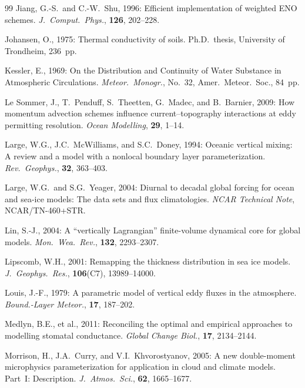 \documentclass[11pt,twoside]{report}
\begin{document}
\begin{thebibliography}{99}
Jiang, G.-S.\ and C.-W.~Shu, 1996:
Efficient implementation of weighted ENO schemes.
\textit{J.\ Comput.\ Phys.}, \textbf{126}, 202--228.

Johansen, O., 1975:
Thermal conductivity of soils.
Ph.D.\ thesis, University of Trondheim, 236~pp.

Kessler, E., 1969:
On the Distribution and Continuity of Water Substance in Atmospheric
Circulations.
\textit{Meteor.\ Monogr.}, No.~32, Amer.\ Meteor.\ Soc., 84~pp.

Le Sommer, J., T.~Penduff, S.~Theetten, G.~Madec, and B.~Barnier, 2009:
How momentum advection schemes influence current--topography interactions at
eddy permitting resolution.
\textit{Ocean Modelling}, \textbf{29}, 1--14.

Large, W.G., J.C.~McWilliams, and S.C.~Doney, 1994:
Oceanic vertical mixing: A review and a model with a nonlocal boundary
layer parameterization.
\textit{Rev.\ Geophys.}, \textbf{32}, 363--403.

Large, W.G.\ and S.G.~Yeager, 2004:
Diurnal to decadal global forcing for ocean and sea-ice models: The data
sets and flux climatologies.
\textit{NCAR Technical Note}, NCAR/TN-460+STR.

Lin, S.-J., 2004:
A ``vertically Lagrangian'' finite-volume dynamical core for global models.
\textit{Mon.\ Wea.\ Rev.}, \textbf{132}, 2293--2307.

Lipscomb, W.H., 2001:
Remapping the thickness distribution in sea ice models.
\textit{J.\ Geophys.\ Res.}, \textbf{106}(C7), 13989--14000.

Louis, J.-F., 1979:
A parametric model of vertical eddy fluxes in the atmosphere.
\textit{Bound.-Layer Meteor.}, \textbf{17}, 187--202.

Medlyn, B.E., et al., 2011:
Reconciling the optimal and empirical approaches to modelling stomatal
conductance.
\textit{Global Change Biol.}, \textbf{17}, 2134--2144.

Morrison, H., J.A.~Curry, and V.I.~Khvorostyanov, 2005:
A new double-moment microphysics parameterization for application in
cloud and climate models. Part~I: Description.
\textit{J.\ Atmos.\ Sci.}, \textbf{62}, 1665--1677.


\end{thebibliography}
\end{document}

